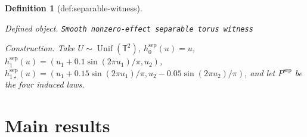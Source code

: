 \documentclass{article}
\newtheorem{definition}{Definition}
\begin{document}
\begin{definition}[def:separable-witness]\label{def:separable-witness}
\par\smallskip\noindent\emph{Defined object.} \texttt{Smooth nonzero-\allowbreak{}effect separable torus witness}
\par\smallskip\noindent\emph{Construction.} Take \(U\sim\operatorname{Unif}(\mathbb T^2)\), \(h_0^{\mathrm{sep}}(u)=u\), \(h_1^{\mathrm{sep}}(u)=(u_1+0.1\sin(2\pi u_1)/\pi,u_2)\), \(h_{1\star}^{\mathrm{sep}}(u)=(u_1+0.15\sin(2\pi u_1)/\pi,u_2-0.05\sin(2\pi u_2)/\pi)\), and let \(P^{\mathrm{sep}}\) be the four induced laws.
\end{definition}

\section{Main results}
\end{document}
